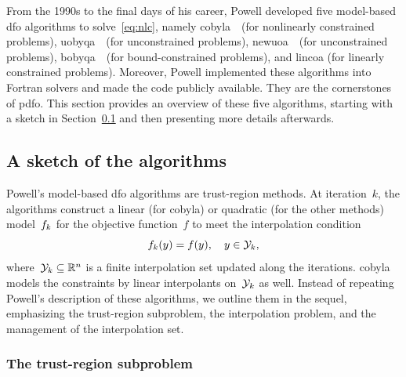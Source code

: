 \documentclass[
    smallextended,  %
    final,          %
]{svjour3}
\newcommand{\R}{\mathbb{R}}
\newcommand{\objm}[1][k]{\obj\ifthenelse{\equal{#1}{}}{}{_{#1}}}
\newcommand{\obj}{f}
\newcommand{\xpt}[1][k]{\mathcal{Y}\ifthenelse{\equal{#1}{}}{}{_{#1}}}
\begin{document}
From the 1990s to the final days of his career, Powell developed five model-based \gls{dfo}
algorithms to solve~\eqref{eq:nlc}, namely \gls{cobyla}~\cite{Powell_1994}~(for nonlinearly
constrained problems), \gls{uobyqa}~\cite{Powell_2002}~(for unconstrained problems),
\gls{newuoa}~\cite{Powell_2006}~(for unconstrained problems), \gls{bobyqa}~\cite{Powell_2009}~(for
bound-constrained problems), and \gls{lincoa} (for linearly constrained problems).
Moreover, Powell implemented these algorithms into Fortran solvers and made the code publicly available.
They are the cornerstones of \gls{pdfo}.
This section provides an overview of these five algorithms, starting with a sketch in
Section~\ref{ssec:sketch} and then presenting more details afterwards.

\subsection{A sketch of the algorithms}
\label{ssec:sketch}

Powell's model-based \gls{dfo} algorithms are trust-region methods.
At iteration~$k$, the algorithms construct a linear (for \gls{cobyla}) or quadratic (for the other methods) model~$\objm$ for the objective function~$f$ to meet the interpolation condition
\begin{equation}
    \label{eq:itpls}
    \objm(y) = \obj(y), \quad y \in \xpt,
\end{equation}
where~$\xpt \subseteq \R^n$ is a finite interpolation set updated along the iterations.
\Gls{cobyla} models the constraints by linear interpolants on~$\xpt$ as well.
Instead of repeating Powell's description of these algorithms, we outline them in the sequel, emphasizing the trust-region subproblem, the interpolation problem, and the management of the interpolation set.

\subsubsection{The trust-region subproblem}
\end{document}
